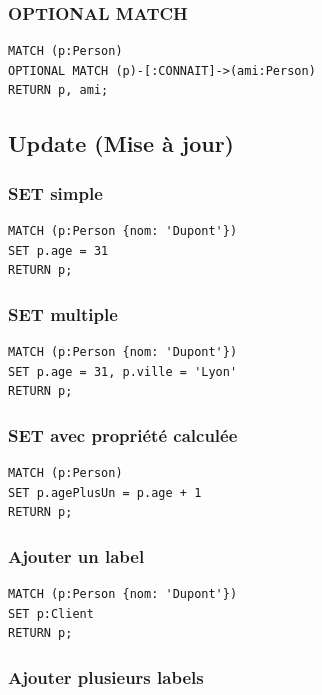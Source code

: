 \documentclass[11pt,a4paper]{article}
\begin{document}
\subsubsection{OPTIONAL MATCH}

\begin{lstlisting}
MATCH (p:Person)
OPTIONAL MATCH (p)-[:CONNAIT]->(ami:Person)
RETURN p, ami;
\end{lstlisting}

\subsection{Update (Mise à jour)}

\subsubsection{SET simple}

\begin{lstlisting}
MATCH (p:Person {nom: 'Dupont'})
SET p.age = 31
RETURN p;
\end{lstlisting}

\subsubsection{SET multiple}

\begin{lstlisting}
MATCH (p:Person {nom: 'Dupont'})
SET p.age = 31, p.ville = 'Lyon'
RETURN p;
\end{lstlisting}

\subsubsection{SET avec propriété calculée}

\begin{lstlisting}
MATCH (p:Person)
SET p.agePlusUn = p.age + 1
RETURN p;
\end{lstlisting}

\subsubsection{Ajouter un label}

\begin{lstlisting}
MATCH (p:Person {nom: 'Dupont'})
SET p:Client
RETURN p;
\end{lstlisting}

\subsubsection{Ajouter plusieurs labels}
\end{document}
